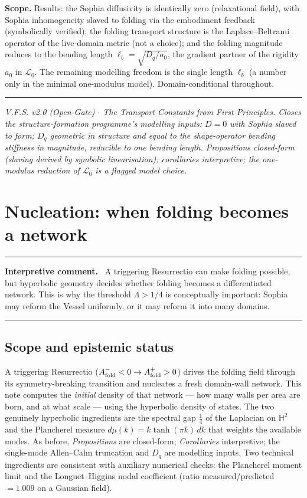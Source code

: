 \documentclass[11pt,a4paper]{article}
\newcommand{\Hh}{\mathbb{H}^2}
\newcommand{\Af}{A_{\rm fold}}
\newcommand{\Dq}{D_q}
\newcommand{\lb}{\ell_b}
\newcommand{\Lop}{\mathcal L_0}
\newenvironment{commentbox}[1]{\begin{center}\begin{minipage}{0.90\textwidth}\hrule\vspace{0.45em}\textbf{#1.}\ }{\vspace{0.45em}\hrule\end{minipage}\end{center}}
\theoremstyle{plain}
\theoremstyle{definition}
\theoremstyle{remark}
\begin{document}
\textbf{Scope.} Results: the Sophia diffusivity is identically zero (relaxational field), with Sophia
inhomogeneity slaved to folding via the embodiment feedback (symbolically verified); the folding
transport structure is the Laplace--Beltrami operator of the live-domain metric (not a choice); and the
folding magnitude reduces to the bending length $\lb=\sqrt{\Dq/a_0}$, the gradient partner of the rigidity
$a_0$ in $\Lop$. The remaining modelling freedom is the single length $\lb$ (a number only in the minimal
one-modulus model). Domain-conditional throughout.

\vspace{0.5em}
\hrule
\smallskip
\noindent\footnotesize\emph{V.F.S. v2.0 (Open-Gate) $\cdot$ The Transport Constants from First Principles.
Closes the structure-formation programme's modelling inputs: $D=0$ with Sophia slaved to form; $\Dq$
geometric in structure and equal to the shape-operator bending stiffness in magnitude, reducible to one
bending length. Propositions closed-form (slaving derived by symbolic linearisation); corollaries interpretive; the
one-modulus reduction of $\Lop$ is a flagged model choice.}
\newpage
\section{Nucleation: when folding becomes a network}
\begin{commentbox}{Interpretive comment}
A triggering Resurrectio can make folding possible, but hyperbolic geometry decides whether folding becomes a differentiated network.  This is why the threshold $\Lambda>1/4$ is conceptually important: Sophia may reform the Vessel uniformly, or it may reform it into many domains.
\end{commentbox}
\subsection*{Scope and epistemic status}
A triggering Resurrectio ($\Af^-<0\to\Af^+>0$) drives the folding field through its symmetry-breaking
transition and nucleates a fresh domain-wall network. This note computes the \emph{initial} density of
that network --- how many walls per area are born, and at what scale --- using the hyperbolic density of
states. The two genuinely hyperbolic ingredients are the spectral gap $\tfrac14$ of the Laplacian on
$\Hh$ and the Plancherel measure $d\mu(k)=k\tanh(\pi k)\,dk$ that weights the available modes. As before,
\emph{Propositions} are closed-form; \emph{Corollaries} interpretive; the single-mode Allen--Cahn
truncation and $\Dq$ are modelling inputs. Two technical ingredients are consistent with auxiliary numerical checks: the
Plancherel moment limit and the Longuet--Higgins nodal coefficient (ratio measured/predicted $=1.009$ on
a Gaussian field).
\end{document}
